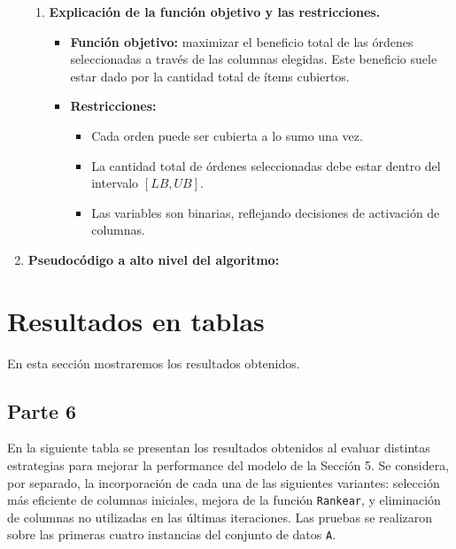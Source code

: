 \documentclass[a4paper,12pt]{article}
\begin{document}
\begin{enumerate}[label=(\alph*), leftmargin=2em]
\begin{enumerate}[label=\roman*., leftmargin=0.2em]
        \item \textbf{Explicación de la función objetivo y las restricciones.}

        \begin{itemize}
            \item \textbf{Función objetivo:} maximizar el beneficio total de las órdenes seleccionadas a través de las columnas elegidas. Este beneficio suele estar dado por la cantidad total de ítems cubiertos.
            
            \item \textbf{Restricciones:}
            \begin{itemize}
                \item Cada orden puede ser cubierta a lo sumo una vez.
                \item La cantidad total de órdenes seleccionadas debe estar dentro del intervalo \([LB, UB]\).
                \item Las variables son binarias, reflejando decisiones de activación de columnas.
            \end{itemize}
        \end{itemize}

    \end{enumerate}


    \item \textbf{Pseudocódigo a alto nivel del algoritmo:}
\end{enumerate}

\clearpage

\section{Resultados en tablas}
En esta sección mostraremos los resultados obtenidos.

\subsection{Parte 6}
En la siguiente tabla se presentan los resultados obtenidos al evaluar distintas estrategias para mejorar la performance del modelo de la Sección 5. Se considera, por separado, la incorporación de cada una de las siguientes variantes: selección más eficiente de columnas iniciales, mejora de la función \texttt{Rankear}, y eliminación de columnas no utilizadas en las últimas iteraciones. Las pruebas se realizaron sobre las primeras cuatro instancias del conjunto de datos \texttt{A}.
\end{document}
